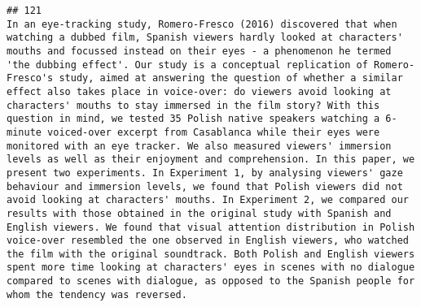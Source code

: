 \documentclass[
  english,
  man]{apa6}
\begin{document}
\begin{verbatim}
## 121                                                                                                                                                                                                                                                                                                                                                                                                                                                                                                                                                                                                                                                                                                                                                                                                                                                                                                                                                                                                                                                                                                                                                                                                            In an eye-tracking study, Romero-Fresco (2016) discovered that when watching a dubbed film, Spanish viewers hardly looked at characters' mouths and focussed instead on their eyes - a phenomenon he termed 'the dubbing effect'. Our study is a conceptual replication of Romero-Fresco's study, aimed at answering the question of whether a similar effect also takes place in voice-over: do viewers avoid looking at characters' mouths to stay immersed in the film story? With this question in mind, we tested 35 Polish native speakers watching a 6-minute voiced-over excerpt from Casablanca while their eyes were monitored with an eye tracker. We also measured viewers' immersion levels as well as their enjoyment and comprehension. In this paper, we present two experiments. In Experiment 1, by analysing viewers' gaze behaviour and immersion levels, we found that Polish viewers did not avoid looking at characters' mouths. In Experiment 2, we compared our results with those obtained in the original study with Spanish and English viewers. We found that visual attention distribution in Polish voice-over resembled the one observed in English viewers, who watched the film with the original soundtrack. Both Polish and English viewers spent more time looking at characters' eyes in scenes with no dialogue compared to scenes with dialogue, as opposed to the Spanish people for whom the tendency was reversed.

\end{verbatim}
\end{document}
